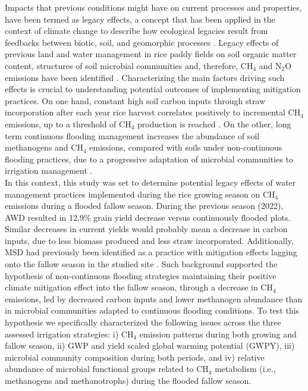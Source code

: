 
Impacts that previous conditions might have on current processes and properties, have been termed as legacy effects, a concept that has been applied in the context of climate change to describe how ecological legacies result from feedbacks between biotic, soil, and geomorphic processes \citep{monger2015legacy}. Legacy effects of previous land and water management in rice paddy fields on soil organic matter content, structures of soil microbial communities and, therefore, CH$_{4}$ and N$_{2}$O emissions have been identified \citep{shao2017, tian2022}. Characterizing the main factors driving such effects is crucial to understanding potential outcomes of implementing mitigation practices. On one hand, constant high soil carbon inputs through straw incorporation after each year rice harvest correlates positively to incremental CH$_{4}$ emissions, up to a threshold of CH$_{4}$ production is reached \citep{hatala2012}. On the other, long term continuous flooding management increases the abundance of soil methanogens and CH$_{4}$ emissions, compared with soils under non-continuous flooding practices, due to a progressive adaptation of microbial communities to irrigation management \citep{lagomarsino2016a}.\\


In this context, this study was set to determine potential legacy effects of water management practices implemented during the rice growing season on CH$_{4}$ emissions during a flooded fallow season. During the previous season (2022), AWD resulted in 12,9\% grain yield decrease versus continuously flooded plots. Similar decreases in current yields would probably mean a decrease in carbon inputs, due to less biomass produced and less straw incorporated. Additionally, MSD had previously been identified as a practice with mitigation effects lagging onto the fallow season in the studied site \citep{martinez-eixarch2022}. Such background supported the hypothesis of non-continuous flooding strategies maintaining their positive climate mitigation effect into the fallow season, through a decrease in CH$_{4}$ emissions, led by decreased carbon inputs and lower methanogen abundance than in microbial communities adapted to continuous flooding conditions. To test this hypothesis we specifically characterized the following issues across the three assessed irrigation strategies: i) CH$_{4}$ emission patterns during both growing and fallow season, ii) GWP and yield scaled global warming potential (GWPY), iii) microbial community composition during both periods, and iv) relative abundance of microbial functional groups related to CH$_{4}$ metabolism (i.e., methanogens and methanotrophs) during the flooded fallow season.\\

